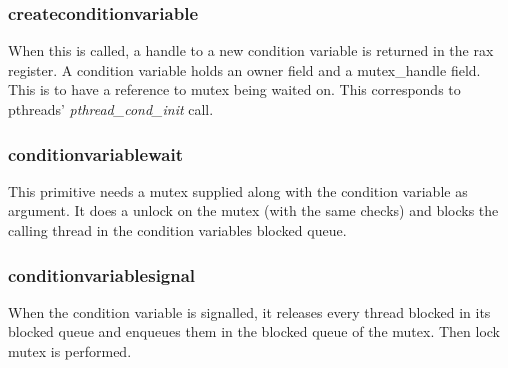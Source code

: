 \subsubsection*{createconditionvariable}
When this is called, a handle to a new condition variable is returned in the rax register. A condition variable holds an owner field and a mutex\_handle field. This is to have a reference to mutex being waited on.
This corresponds to pthreads' \emph{pthread\_cond\_init} call.
\subsubsection*{conditionvariablewait}
This primitive needs a mutex supplied along with the condition variable as argument. It does a unlock on the mutex (with the same checks) and blocks the calling thread in the condition variables blocked queue.
\subsubsection*{conditionvariablesignal}
When the condition variable is signalled, it releases every thread blocked in its blocked queue and enqueues them in the blocked queue of the mutex. Then lock mutex is performed.





